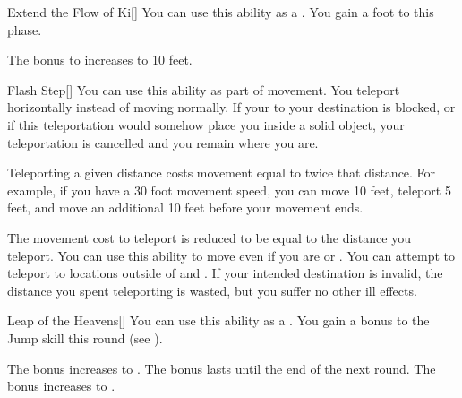 {            \begin{freeability}{Extend the Flow of Ki}[]
                You can use this ability as a .
                You gain a  foot  to  this phase.

                \rankline
                 The bonus to  increases to 10 feet.
            \end{freeability}

            \begin{freeability}{Flash Step}[]
                You can use this ability as part of movement.
                You teleport horizontally instead of moving normally.
                If your  to your destination is blocked, or if this teleportation would somehow place you inside a solid object, your teleportation is cancelled and you remain where you are.

                Teleporting a given distance costs movement equal to twice that distance.
                For example, if you have a 30 foot movement speed, you can move 10 feet, teleport 5 feet, and move an additional 10 feet before your movement ends.

                \rankline
                 The movement cost to teleport is reduced to be equal to the distance you teleport.
                 You can use this ability to move even if you are  or .
                 You can attempt to teleport to locations outside of  and .
                If your intended destination is invalid, the distance you spent teleporting is wasted, but you suffer no other ill effects.
            \end{freeability}

            \begin{freeability}{Leap of the Heavens}[]
                You can use this ability as a .
                You gain a  bonus to the Jump skill this round (see ).

                \rankline
                 The bonus increases to .
                 The bonus lasts until the end of the next round.
                 The bonus increases to .
            \end{freeability}

}
